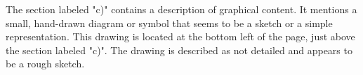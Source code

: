The section labeled "c)" contains a description of graphical content. It mentions a small, hand-drawn diagram or symbol that seems to be a sketch or a simple representation. This drawing is located at the bottom left of the page, just above the section labeled "c)". The drawing is described as not detailed and appears to be a rough sketch.